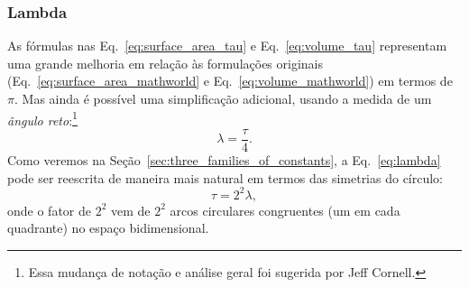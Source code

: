 \subsubsection{Lambda} %
\label{sec:lambda}

As fórmulas nas Eq.~\eqref{eq:surface_area_tau} e Eq.~\eqref{eq:volume_tau} representam uma grande melhoria em relação às formulações originais (Eq.~\eqref{eq:surface_area_mathworld} e Eq.~\eqref{eq:volume_mathworld}) em termos de $\pi$. Mas ainda é possível uma simplificação adicional, usando a medida de um \emph{ângulo reto}:\footnote{Essa mudança de notação e análise geral foi sugerida por Jeff Cornell.}
\begin{equation}
\label{eq:lambda}
\lambda = \frac{\tau}{4}.
\end{equation}
Como veremos na Seção~\ref{sec:three_families_of_constants}, a Eq.~\eqref{eq:lambda} pode ser reescrita de maneira mais natural em termos das simetrias do círculo:
\begin{equation}
\label{eq:tau_lambda}
\tau = 2^2 \lambda,
\end{equation}
onde o fator de $2^2$ vem de $2^2$ arcos circulares congruentes (um em cada quadrante) no espaço bidimensional.


